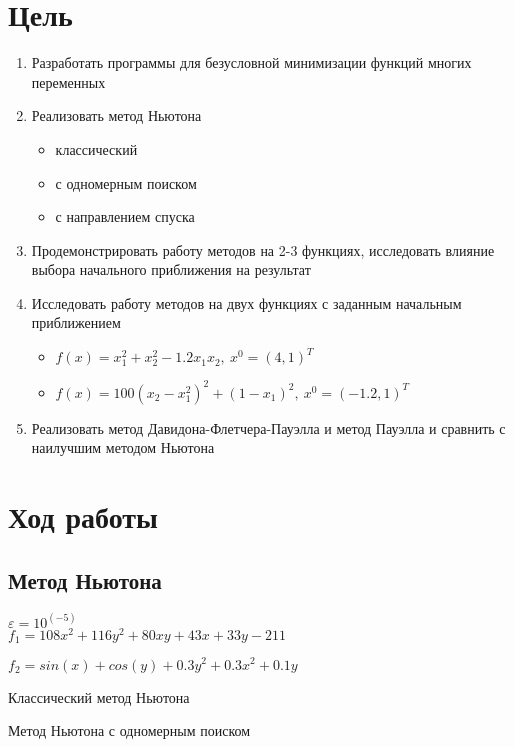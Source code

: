 \section{Цель}
\begin{enumerate}
	\item Разработать программы для безусловной минимизации функций
	многих переменных
	\item Реализовать метод Ньютона
		\begin{itemize}
			\item классический
			\item с одномерным поиском
			\item с направлением спуска
		\end{itemize}
	\item Продемонстрировать работу методов на 2-3 функциях, исследовать влияние выбора начального приближения на результат
	\item Исследовать работу методов на двух функциях с заданным начальным приближением
		\begin{itemize}
			\item \(f(x) = x_1^2 + x_2^2 - 1.2x_1x_2,\ x^0 = (4, 1)^T\)
			\item \(f(x) = 100(x_2 - x_1^2)^2 + (1 - x_1)^2,\ x^0 = (-1.2, 1)^T\)	
		\end{itemize}
	\item Реализовать метод Давидона-Флетчера-Пауэлла и метод Пауэлла и сравнить с наилучшим методом Ньютона
\end{enumerate}

\section{Ход работы}

\subsection{Метод Ньютона}

\(\varepsilon = 10^(-5)\)\\

\(f_1 = 108x^2 + 116y^2 + 80xy + 43x + 33y - 211\)\\

\(f_2 = sin(x) + cos(y) + 0.3y^2+ 0.3x^2 + 0.1y\)

Классический метод Ньютона\\

Метод Ньютона с одномерным поиском\\

